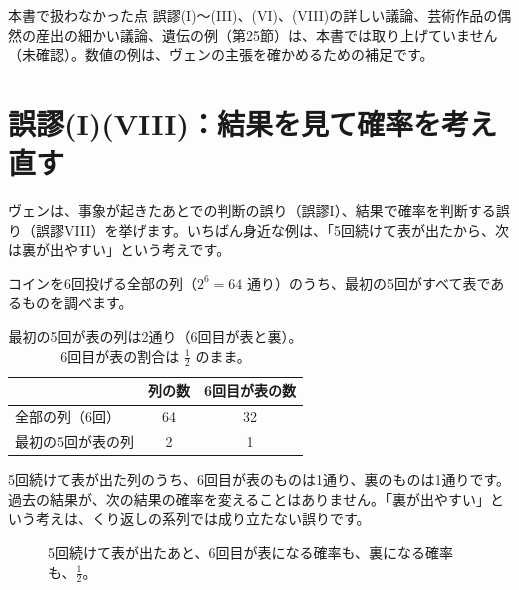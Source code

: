 \documentclass[a4paper,11pt,openany]{ltjsbook}
\begin{document}
\begin{notebox}{本書で扱わなかった点}
誤謬(I)〜(III)、(VI)、(VIII)の詳しい議論、芸術作品の偶然の産出の細かい議論、遺伝の例（第25節）は、本書では取り上げていません（未確認）。数値の例は、ヴェンの主張を確かめるための補足です。
\end{notebox}

\section{誤謬(I)(VIII)：結果を見て確率を考え直す}

ヴェンは、事象が起きたあとでの判断の誤り（誤謬I）、結果で確率を判断する誤り（誤謬VIII）を挙げます。いちばん身近な例は、「5回続けて表が出たから、次は裏が出やすい」という考えです。

コインを6回投げる全部の列（$2^6=64$ 通り）のうち、最初の5回がすべて表であるものを調べます。

\begin{table}[htbp]
\centering
\begin{tabular}{lcc}
\toprule
 & 列の数 & 6回目が表の数\\
\midrule
全部の列（6回） & 64 & 32\\
最初の5回が表の列 & 2 & 1\\
\bottomrule
\end{tabular}
\caption{最初の5回が表の列は2通り（6回目が表と裏）。6回目が表の割合は $\tfrac12$ のまま。}
\end{table}

5回続けて表が出た列のうち、6回目が表のものは1通り、裏のものは1通りです。過去の結果が、次の結果の確率を変えることはありません。「裏が出やすい」という考えは、くり返しの系列では成り立たない誤りです。

\begin{figure}[htbp]
\centering
{}
\caption{5回続けて表が出たあと、6回目が表になる確率も、裏になる確率も、$\tfrac12$。}
\end{figure}
\end{document}
